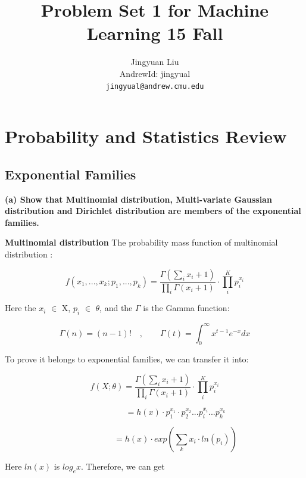\documentclass{article} %
\title{Problem Set 1 for Machine Learning 15 Fall}
\author{
Jingyuan Liu\\
AndrewId: jingyual\\
\texttt{jingyual@andrew.cmu.edu} \\
}
\begin{document}
\maketitle


\section{Probability and Statistics Review}



\subsection{Exponential Families}
\textbf{(a) Show that Multinomial distribution, Multi-variate Gaussian distribution and
Dirichlet distribution are members of the exponential families.}

\textbf{Multinomial distribution} The probability mass function of multinomial
distribution :

\begin{equation}
\label{equ:multinomial}
f(x_{1},...,x_{k};p_{1},...,p_{k}) = \frac{\Gamma ( \sum_{i} {x_{i}} + 1)}
{\prod_{i} \Gamma (x_{i} + 1)} \cdot \prod_{i}^{K} p_{i}^{x_{i}}
\end{equation}

Here the $x_{i}$ $\in$ X, $p_{i}$ $\in$ $\theta$, and the $\Gamma$ is the Gamma
function:

\begin{equation}
\label{GammaFunction}
\Gamma (n) = (n-1) ! \quad , \qquad \Gamma (t) = \int_0^\infty x^{t-1}e^{-x} dx
\end{equation}

To prove it belongs to exponential families, we can transfer it into:

\begin{equation}
f(X ; \theta) = \frac{\Gamma ( \sum_{i} {x_{i}} + 1)}
{\prod_{i} \Gamma (x_{i} + 1)} \cdot \prod_{i}^{K} p_{i}^{x_{i}}
\end{equation}

\begin{equation}
\qquad \qquad \quad = h(x) \cdot p_1^{x_1} \cdot p_2^{x_2} ... p_i^{x_i} ... p_k^{x_k}
\end{equation}

\begin{equation}
\qquad \qquad \quad = h(x) \cdot exp ( \sum_k x_i \cdot ln(p_i))
\end{equation}

Here $ln(x)$ is $log_e x$. Therefore, we can get
\end{document}
